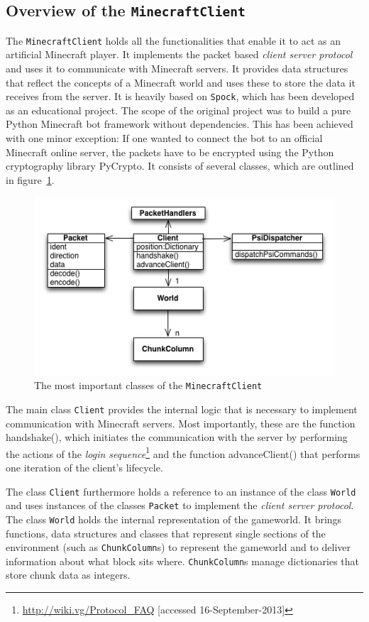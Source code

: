        \subsection{Overview of the \texttt{MinecraftClient}}
The \texttt{MinecraftClient} holds all the functionalities that enable it to act as an artificial Minecraft player. It implements the packet based \emph{client server protocol} and uses it to communicate with Minecraft servers. It provides data structures that reflect the concepts of a Minecraft world and uses these to store the data it receives from the server. It is heavily based on \texttt{Spock}, which has been developed as an educational project. The scope of the original project was to build a pure Python Minecraft bot framework without dependencies. This has been achieved with one minor exception: If one wanted to connect the bot to an official Minecraft online server, the packets have to be encrypted using the Python cryptography library PyCrypto. It consists of several classes, which are outlined in figure~\ref{spock_UML}.

\begin{figure}[h]
  \centering
    \includegraphics[width=12cm]{graphics/spockUML_v14}
  \caption{The most important classes of the \texttt{MinecraftClient}}
  \label{spock_UML}
\end{figure}

The main class \texttt{Client} provides the internal logic that is necessary to implement communication with Minecraft servers. Most importantly, these are the function handshake(), which initiates the communication with the server by performing the actions of the \emph{login sequence}\footnote{\url{http://wiki.vg/Protocol_FAQ} [accessed 16-September-2013]} and the function advanceClient() that performs one iteration of the client's lifecycle.


The class \texttt{Client} furthermore holds a reference to an instance of the class \texttt{World} and uses instances of the classes \texttt{Packet} to implement the \emph{client server protocol}. The class \texttt{World} holds the internal representation of the gameworld. It brings functions, data structures and classes that represent single sections of the environment (such as \texttt{ChunkColumn}s) to represent the gameworld and to deliver information about what block sits where. \texttt{ChunkColumn}s manage dictionaries that store chunk data as integers.

